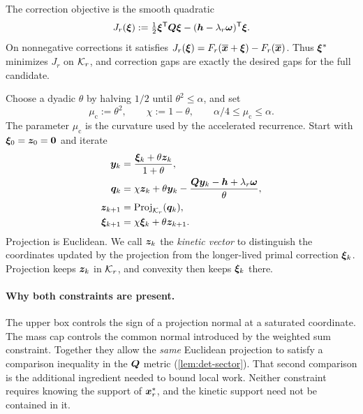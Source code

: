 The correction objective is the smooth quadratic
\begin{equation*}
 J_r(\bm{\xi}):=\tfrac12\bm{\xi}^{\mathsf{T}}\bm{Q}\bm{\xi}
                 -(\bm{h}-\lambda_r\bm{\omega})^{\mathsf{T}}\bm{\xi}.
\end{equation*}
On nonnegative corrections it satisfies
$J_r(\bm{\xi})=F_r(\overline{\bm{x}}+\bm{\xi})-F_r(\overline{\bm{x}})$.
Thus $\bm{\xi}^*$ minimizes $J_r$ on $\mathcal{K}_r$, and correction gaps are
exactly the desired gaps for the full candidate.

Choose a dyadic $\theta$ by halving $1/2$ until $\theta^2\leq\alpha$, and set
\begin{equation}
 \mu_{\mathrm{c}}:=\theta^2,\qquad \chi:=1-\theta,
 \qquad \alpha/4\leq\mu_{\mathrm{c}}\leq\alpha.
 \label{eq:det-acceleration-parameters}
\end{equation}
The parameter $\mu_{\mathrm{c}}$ is the curvature used by the accelerated
recurrence. Start with $\bm{\xi}_0=\bm{z}_0=\bm{0}$ and iterate
\begin{equation}
 \begin{aligned}
 \bm{y}_k&=\frac{\bm{\xi}_k+\theta\bm{z}_k}{1+\theta},\\
 \bm{q}_k&=\chi\bm{z}_k+\theta\bm{y}_k
       -\frac{\bm{Q}\bm{y}_k-\bm{h}+\lambda_r\bm{\omega}}{\theta},\\
 \bm{z}_{k+1}&=\operatorname{Proj}_{\mathcal{K}_r}(\bm{q}_k),\\
 \bm{\xi}_{k+1}&=\chi\bm{\xi}_k+\theta\bm{z}_{k+1}.
 \end{aligned}
 \label{eq:det-iteration}
\end{equation}
Projection is Euclidean. We call $\bm{z}_k$ the \emph{kinetic vector} to
distinguish the coordinates updated by the projection from the longer-lived
primal correction $\bm{\xi}_k$. Projection keeps $\bm{z}_k$ in $\mathcal{K}_r$, and
convexity then keeps $\bm{\xi}_k$ there.

\paragraph{Why both constraints are present.}
The upper box controls the sign of a projection normal at a saturated
coordinate. The mass cap controls the common normal introduced by the
weighted sum constraint. Together they allow the \emph{same} Euclidean
projection to satisfy a comparison inequality in the $\bm{Q}$ metric
(\cref{lem:det-sector}). That second comparison is the additional ingredient
needed to bound local work. Neither constraint requires knowing the support
of $\bm{x}_r^*$, and the kinetic support need not be contained in it.

